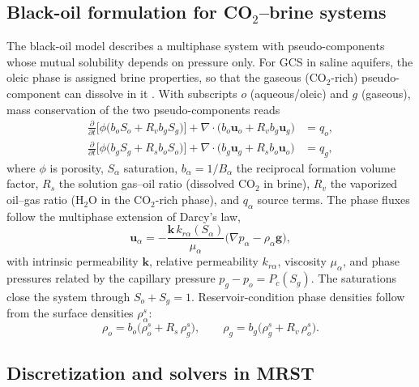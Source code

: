 \documentclass[preprint,11pt]{elsarticle}
\begin{document}
\subsection{Black-oil formulation for CO$_2$--brine systems}

The black-oil model describes a multiphase system with pseudo-components
whose mutual solubility depends on pressure only. For GCS in saline
aquifers, the oleic phase is assigned brine properties, so that the
gaseous (CO$_2$-rich) pseudo-component can dissolve in it
\cite{hassanzadeh2008,salo2024}. With subscripts $o$ (aqueous/oleic) and
$g$ (gaseous), mass conservation of the two pseudo-components reads
\begin{align}
\frac{\partial}{\partial t}\Big[\phi\big(b_o S_o + R_v b_g S_g\big)\Big]
 + \nabla\cdot\big(b_o \mathbf{u}_o + R_v b_g \mathbf{u}_g\big) &= q_o,
\label{eq:bo-oleic}\\
\frac{\partial}{\partial t}\Big[\phi\big(b_g S_g + R_s b_o S_o\big)\Big]
 + \nabla\cdot\big(b_g \mathbf{u}_g + R_s b_o \mathbf{u}_o\big) &= q_g,
\label{eq:bo-gas}
\end{align}
where $\phi$ is porosity, $S_\alpha$ saturation,
$b_\alpha = 1/B_\alpha$ the reciprocal formation volume factor, $R_s$ the
solution gas--oil ratio (dissolved CO$_2$ in brine), $R_v$ the vaporized
oil--gas ratio (H$_2$O in the CO$_2$-rich phase), and $q_\alpha$ source
terms. The phase fluxes follow the multiphase extension of Darcy's law,
\begin{equation}
\mathbf{u}_\alpha = -\frac{\mathbf{k}\, k_{r\alpha}(S_\alpha)}
{\mu_\alpha}\big(\nabla p_\alpha - \rho_\alpha \mathbf{g}\big),
\label{eq:darcy}
\end{equation}
with intrinsic permeability $\mathbf{k}$, relative permeability
$k_{r\alpha}$, viscosity $\mu_\alpha$, and phase pressures related by the
capillary pressure $p_g - p_o = P_c(S_g)$. The saturations close the
system through $S_o + S_g = 1$. Reservoir-condition phase densities
follow from the surface densities $\rho_\alpha^s$:
\begin{equation}
\rho_o = b_o\big(\rho_o^s + R_s\,\rho_g^s\big), \qquad
\rho_g = b_g\big(\rho_g^s + R_v\,\rho_o^s\big).
\label{eq:densities}
\end{equation}

\subsection{Discretization and solvers in MRST}
\end{document}
